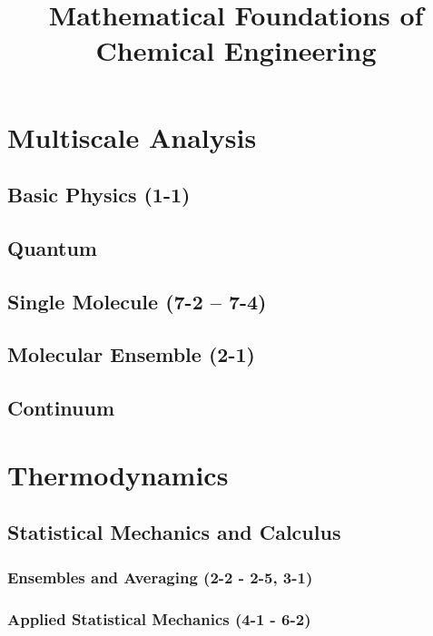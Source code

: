 \documentclass{mitqualif}
\title{Mathematical Foundations of Chemical Engineering}
\begin{document}
\mytitlepage %
\newpage

\tableofcontents
\newpage

%
\chapter{Multiscale Analysis}
\section{Basic Physics (1-1)}

\section{Quantum}
\section{Single Molecule (7-2 -- 7-4)}



\section{Molecular Ensemble (2-1)}

\section{Continuum}
\clearpage
\chapter{Thermodynamics}
\section{Statistical Mechanics and Calculus}
\subsection{Ensembles and Averaging (2-2 - 2-5, 3-1)}





\clearpage
\subsection{Applied Statistical Mechanics (4-1 - 6-2)}
\end{document}
